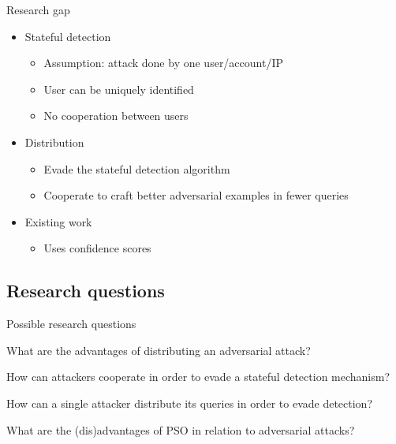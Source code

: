 \documentclass[11pt,t]{beamer}
\begin{document}
\begin{frame}{Research gap}
\begin{itemize}
	\item Stateful detection
	\begin{itemize}
		\item Assumption: attack done by \alert{one} user/account/IP
		\item User can be uniquely identified
		\item No cooperation between users
	\end{itemize}
	
	\item Distribution
	\begin{itemize}
		\item Evade the stateful detection algorithm
		\item Cooperate to craft better adversarial examples in fewer queries
	\end{itemize}
	
	\item Existing work
	\begin{itemize}
		\item Uses confidence scores \cite{10.1007/978-3-030-59013-0_22, s20247158}
	\end{itemize}
\end{itemize}
\end{frame}

\subsection{Research questions}
\begin{frame}{Possible research questions}
\begin{exampleblock}
	{What are the advantages of distributing an adversarial attack?}
	\end{exampleblock}
	
	\begin{exampleblock}
	{How can attackers cooperate in order to evade a stateful detection mechanism?}
	\end{exampleblock}
	
	\begin{exampleblock}
	{How can a single attacker distribute its queries in order to evade detection?}
	\end{exampleblock}
	
	\begin{exampleblock}
	{What are the (dis)advantages of PSO in relation to adversarial attacks?}
	\end{exampleblock}
\end{frame}
\end{document}
